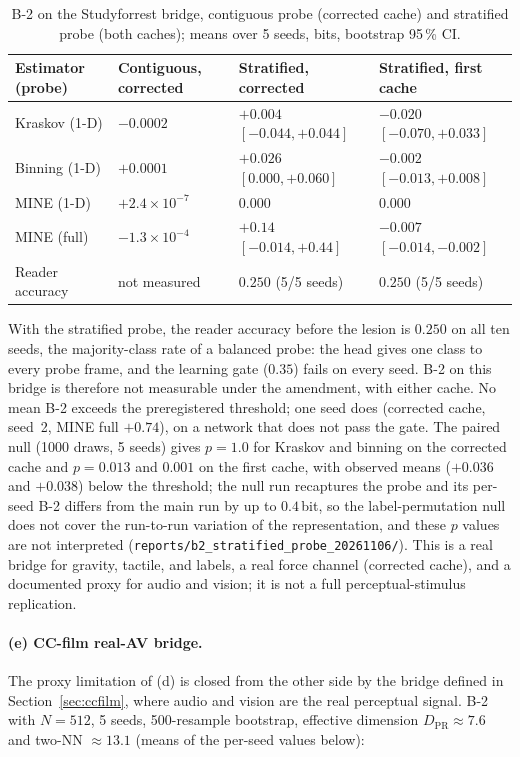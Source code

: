 \documentclass{article}
\begin{document}
\begin{table}[ht]
  \centering
  \caption{B-2 on the Studyforrest bridge, contiguous probe (corrected
  cache) and stratified probe (both caches); means over 5 seeds, bits,
  bootstrap 95\,\% CI.}
  \label{tab:e1-studyforrest-strat}
  \small
  \begin{tabular}{llll}
    \toprule
    Estimator (probe) & Contiguous, corrected & Stratified, corrected & Stratified, first cache \\
    \midrule
    Kraskov (1-D)  & $-0.0002$ & $+0.004$ $[-0.044, +0.044]$ & $-0.020$ $[-0.070, +0.033]$ \\
    Binning (1-D)  & $+0.0001$ & $+0.026$ $[0.000, +0.060]$ & $-0.002$ $[-0.013, +0.008]$ \\
    MINE (1-D)     & $+2.4\times 10^{-7}$ & $0.000$ & $0.000$ \\
    MINE (full)    & $-1.3\times 10^{-4}$ & $+0.14$ $[-0.014, +0.44]$ & $-0.007$ $[-0.014, -0.002]$ \\
    Reader accuracy & not measured & $0.250$ (5/5 seeds) & $0.250$ (5/5 seeds) \\
    \bottomrule
  \end{tabular}
\end{table}

With the stratified probe, the reader accuracy before the lesion is
$0.250$ on all ten seeds, the majority-class rate of a balanced
probe: the head gives one class to every probe frame, and the
learning gate ($0.35$) fails on every seed. B-2 on this bridge is
therefore not measurable under the amendment, with either cache. No
mean B-2 exceeds the preregistered threshold; one seed does (corrected
cache, seed~2, MINE full $+0.74$), on a network that does not pass the
gate. The paired null (1000 draws, 5 seeds) gives $p = 1.0$ for
Kraskov and binning on the corrected cache and $p = 0.013$ and
$0.001$ on the first cache, with observed means ($+0.036$ and
$+0.038$) below the threshold; the null run recaptures the probe and
its per-seed B-2 differs from the main run by up to $0.4$\,bit, so the
label-permutation null does not cover the run-to-run variation of the
representation, and these $p$ values are not interpreted
(\texttt{reports/b2\_stratified\_probe\_20261106/}). This is a real bridge for gravity,
tactile, and labels, a real force channel (corrected cache), and a
documented proxy for audio and vision; it is not a full
perceptual-stimulus replication.

\paragraph{(e) CC-film real-AV bridge.} The proxy limitation of (d) is
closed from the other side by the bridge defined in
Section~\ref{sec:ccfilm}, where audio and vision are the real
perceptual signal. B-2 with $N = 512$, 5 seeds, 500-resample
bootstrap, effective dimension $D_{\mathrm{PR}} \approx 7.6$ and
two-NN $\approx 13.1$ (means of the per-seed values below):
\end{document}
